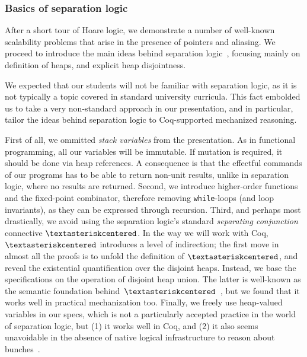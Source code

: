 \documentclass[blockstyle,preprint]{sigplanconf}
\newcommand{\an}[1]{\textcolor{red}{(Aleks: {#1})}}
\newcommand{\code}[1]{\lstinline{#1}}
\newcommand{\sep}{\textasteriskcentered}
\begin{document}
\subsubsection{Basics of separation logic}
\label{sec:sep-log}
After a short tour of Hoare logic, we demonstrate a number of
well-known scalability problems that arise in the presence of pointers
and aliasing. We proceed to introduce the main ideas behind separation
logic~\cite{Ishtiaq-Ohearn:POPL01,Reynolds:LICS02}, focusing mainly on
definition of heaps, and explicit heap disjointness.
%

We expected that our students will not be familiar with separation
logic, as it is not typically a topic covered in standard university
curricula. This fact embolded us to take a very non-standard approach
in our presentation, and in particular, tailor the ideas behind
separation logic to Coq-supported mechanized reasoning.

%
First of all, we ommitted \emph{stack variables} from the
presentation. As in functional programming, all our variables will be
immutable. If mutation is required, it should be done via heap
references. A consequence is that the effectful commands of our
programs has to be able to return non-unit results, unlike in
separation logic, where no results are returned.  Second, we introduce
higher-order functions and the fixed-point combinator, therefore
removing \code{while}-loops (and loop invariants), as they can be
expressed through recursion.  Third, and perhaps most drastically, we
avoid using the separation logic's standard \emph{separating
  conjunction} connective $\sep$. In the way we will work with Coq,
$\sep$ introduces a level of indirection; the first move in almost all
the proofs is to unfold the definition of $\sep$, and reveal the
existential quantification over the disjoint heaps. Instead, we base
the specifications on the operation of disjoint heap union. The latter
is well-known as the semantic foundation
behind~$\sep$~\cite{Calcagno-al:LICS07}, but we found that it works
well in practical mechanization too. Finally, we freely use
heap-valued variables in our specs, which is not a particularly
accepted practice in the world of separation logic, but (1) it works
well in Coq, and (2) it also seems unavoidable in the absence of
native logical infrastructure to reason about
bunches~\cite{Nanevski-al:POPL10}.
\end{document}
